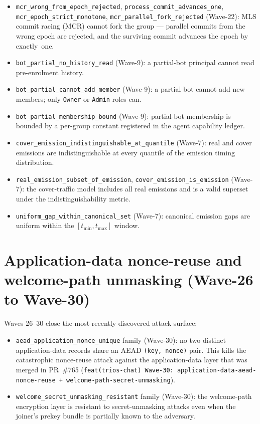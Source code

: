 \begin{itemize}
  \item \texttt{mcr\_wrong\_from\_epoch\_rejected},
        \texttt{process\_commit\_advances\_one},
        \texttt{mcr\_epoch\_strict\_monotone},
        \texttt{mcr\_parallel\_fork\_rejected} (Wave-22): MLS commit
        racing (MCR) cannot fork the group --- parallel commits from
        the wrong epoch are rejected, and the surviving commit advances
        the epoch by exactly~one.
  \item \texttt{bot\_partial\_no\_history\_read} (Wave-9):
        a partial-bot principal cannot read pre-enrolment history.
  \item \texttt{bot\_partial\_cannot\_add\_member} (Wave-9): a partial
        bot cannot add new members; only \texttt{Owner} or
        \texttt{Admin} roles can.
  \item \texttt{bot\_partial\_membership\_bound} (Wave-9):
        partial-bot membership is bounded by a per-group constant
        registered in the agent capability ledger.
  \item \texttt{cover\_emission\_indistinguishable\_at\_quantile}
        (Wave-7): real and cover emissions are indistinguishable at
        every quantile of the emission timing distribution.
  \item \texttt{real\_emission\_subset\_of\_emission},
        \texttt{cover\_emission\_is\_emission} (Wave-7):
        the cover-traffic model includes all real emissions and is a
        valid superset under the indistinguishability metric.
  \item \texttt{uniform\_gap\_within\_canonical\_set} (Wave-7):
        canonical emission gaps are uniform within the
        $[t_{\min}, t_{\max}]$ window.
\end{itemize}

\section{Application-data nonce-reuse and welcome-path unmasking (Wave-26 to Wave-30)}
\label{sec:chat:wave-30}

Waves 26--30 close the most recently discovered attack surface:

\begin{itemize}
  \item \texttt{aead\_application\_nonce\_unique} family (Wave-30):
        no two distinct application-data records share an AEAD
        \texttt{(key, nonce)} pair. This kills the catastrophic
        nonce-reuse attack against the application-data layer that was
        merged in PR~\#765 (\texttt{feat(trios-chat) Wave-30:
        application-data-aead-nonce-reuse +
        welcome-path-secret-unmasking}).
  \item \texttt{welcome\_secret\_unmasking\_resistant} family
        (Wave-30): the welcome-path encryption layer is resistant to
        secret-unmasking attacks even when the joiner's prekey bundle
        is partially known to the adversary.
\end{itemize}

